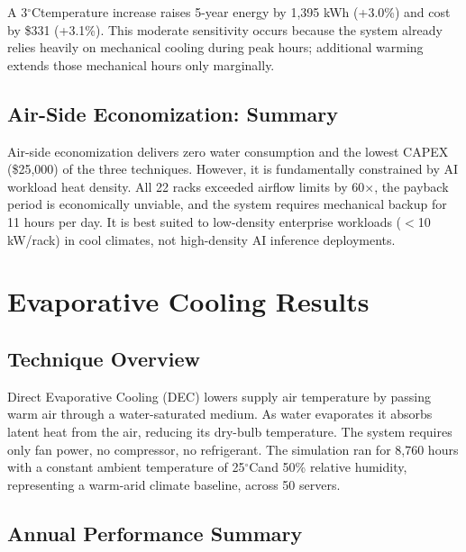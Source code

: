 ﻿\documentclass[12pt,a4paper]{report}
\newcommand{\degC}{$^{\circ}$C}
\begin{document}
\noindent A 3\degC temperature increase raises 5-year energy by 1{,}395 kWh (+3.0\%) and cost
by \$331 (+3.1\%). This moderate sensitivity occurs because the system already relies
heavily on mechanical cooling during peak hours; additional warming extends those
mechanical hours only marginally.

\subsection{Air-Side Economization: Summary}

Air-side economization delivers zero water consumption and the lowest CAPEX (\$25{,}000)
of the three techniques. However, it is fundamentally constrained by AI workload heat
density. All 22 racks exceeded airflow limits by 60$\times$, the payback period is
economically unviable, and the system requires mechanical backup for 11 hours per day.
It is best suited to low-density enterprise workloads ($<$10 kW/rack) in cool climates,
not high-density AI inference deployments.

\section{Evaporative Cooling Results}
\label{sec:evap}

\subsection{Technique Overview}

Direct Evaporative Cooling (DEC) lowers supply air temperature by passing warm air through
a water-saturated medium. As water evaporates it absorbs latent heat from the air, reducing
its dry-bulb temperature. The system requires only fan power, no compressor, no
refrigerant. The simulation ran for 8{,}760 hours with a constant ambient temperature of
25\degC and 50\% relative humidity, representing a warm-arid climate baseline, across
50 servers.

\subsection{Annual Performance Summary}
\end{document}
